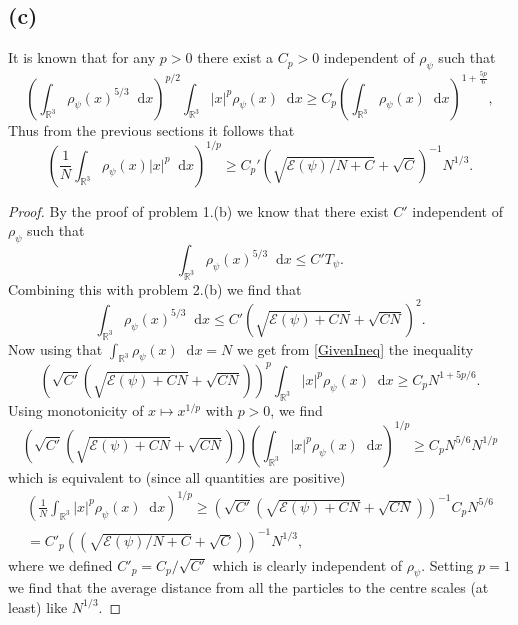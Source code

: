 \documentclass[a4paper,11pt]{article}
\newcommand{\abs}[1]{\left\lvert #1 \right\rvert}
\newcommand*\diff{\mathop{}\!\mathrm{d}}
\newcommand{\R}{\mathbb{R}}
\numberwithin{equation}{section}
\begin{document}
 	\subsection*{(c)}
 	It is known that for any $ p>0 $ there exist a $ C_p>0 $ independent of $ \rho_\psi $ such that \begin{equation}\label{GivenIneq}
 	\left(\int_{\R^3}\rho_\psi(x)^{5/3} \diff x\right)^{p/2}\int_{\R^3}\abs{x}^p\rho_\psi(x) \diff x\geq C_p\left(\int_{\R^3}\rho_\psi(x) \diff x\right)^{1+\frac{5p}{6}},
 	\end{equation}
 	Thus from the previous sections it follows that\begin{equation}
 	\left(\frac{1}{N}\int_{\R^3}\rho_\psi(x)\abs{x}^p\diff x\right)^{1/p}\geq C_p'\left(\sqrt{\mathcal{E}(\psi)/N+C}+\sqrt{C}\right)^{-1}N^{1/3}.
 	\end{equation}
 	\begin{proof}
 		By the proof of problem 1.(b) we know that there exist $ C' $ independent of $ \rho_\psi $ such that \begin{equation}
 		\int_{\R^3}\rho_\psi(x)^{5/3} \diff x\leq C'T_\psi.
 		\end{equation}
 		Combining this with problem 2.(b) we find that \begin{equation}
 		\int_{\R^3}\rho_\psi(x)^{5/3} \diff x\leq C'(\sqrt{\mathcal{E}(\psi)+CN}+\sqrt{CN})^2.
 		\end{equation}
 		Now using that $ \int_{\R^3}\rho_\psi(x)\diff x=N $ we get from \eqref{GivenIneq} the inequality\begin{equation}
 		\left(\sqrt{C'}(\sqrt{\mathcal{E}(\psi)+CN}+\sqrt{CN})\right)^{p}\int_{\R^3}\abs{x}^p\rho_\psi(x) \diff x\geq C_pN^{1+5p/6}.
 		\end{equation}
 		Using monotonicity of $ x\mapsto x^{1/p} $ with $ p>0 $, we find \begin{equation}
 		\left(\sqrt{C'}(\sqrt{\mathcal{E}(\psi)+CN}+\sqrt{CN})\right)\left(\int_{\R^3}\abs{x}^p\rho_\psi(x) \diff x\right)^{1/p}\geq C_pN^{5/6}N^{1/p}
 		\end{equation}
 		which is equivalent to (since all quantities are positive) \begin{equation}
 		\begin{aligned}
 		\left(\frac{1}{N}\int_{\R^3}\abs{x}^p\rho_\psi(x) \diff x\right)^{1/p}\geq \left(\sqrt{C'}(\sqrt{\mathcal{E}(\psi)+CN}+\sqrt{CN})\right)^{-1} C_pN^{5/6}\\=C'_p\left((\sqrt{\mathcal{E}(\psi)/N+C}+\sqrt{C})\right)^{-1}N^{1/3},
 		\end{aligned}
 		\end{equation}
 		where we defined $ C'_p=C_p/\sqrt{C'} $ which is clearly independent of $ \rho_\psi $. Setting $ p=1 $ we find that the average distance from all the particles to the centre scales (at least) like $ N^{1/3} $.
 	\end{proof}
\end{document}
